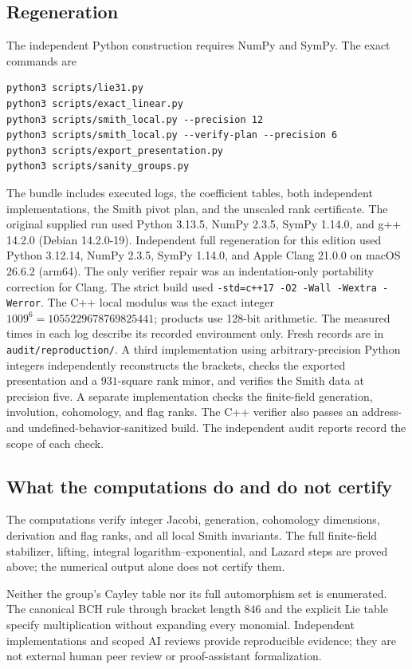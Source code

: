 \documentclass[11pt]{article}
\theoremstyle{definition}\newtheorem{definition}[theorem]{Definition}
\theoremstyle{remark}\newtheorem{remark}[theorem]{Remark}
\begin{document}
\subsection{Regeneration}
The independent Python construction requires NumPy and SymPy. The exact
commands are
\begin{verbatim}
python3 scripts/lie31.py
python3 scripts/exact_linear.py
python3 scripts/smith_local.py --precision 12
python3 scripts/smith_local.py --verify-plan --precision 6
python3 scripts/export_presentation.py
python3 scripts/sanity_groups.py
\end{verbatim}
The bundle includes executed logs, the coefficient tables, both independent
implementations, the Smith pivot plan, and the unscaled rank certificate.
The original supplied run used Python 3.13.5, NumPy 2.3.5, SymPy 1.14.0,
and g++ 14.2.0 (Debian 14.2.0-19). Independent full regeneration for this
edition used Python 3.12.14, NumPy 2.3.5, SymPy 1.14.0, and Apple Clang
21.0.0 on macOS 26.6.2 (arm64). The only verifier repair was an
indentation-only portability correction for Clang. The strict build used
\texttt{-std=c++17 -O2 -Wall -Wextra -Werror}.
The C++ local modulus was the exact integer
$1009^6=1055229678769825441$; products use 128-bit arithmetic.
The measured times in each log describe its recorded environment only.
Fresh records are in \texttt{audit/reproduction/}. A third implementation
using arbitrary-precision Python integers independently reconstructs the
brackets, checks the exported presentation and a $931$-square rank minor,
and verifies the Smith data at precision five. A separate implementation
checks the finite-field generation, involution, cohomology, and flag ranks.
The C++ verifier also passes an address- and undefined-behavior-sanitized
build. The independent audit reports record the scope of each check.

\subsection{What the computations do and do not certify}
The computations verify integer Jacobi, generation, cohomology dimensions,
derivation and flag ranks, and all local Smith invariants. The full
finite-field stabilizer, lifting, integral logarithm--exponential, and Lazard
steps are proved above; the numerical output alone does not certify them.

Neither the group's Cayley table nor its full automorphism set is enumerated.
The canonical BCH rule through bracket length $846$ and the explicit Lie table
specify multiplication without expanding every monomial. Independent
implementations and scoped AI reviews provide reproducible evidence; they
are not external human peer review or proof-assistant formalization.
\end{document}
